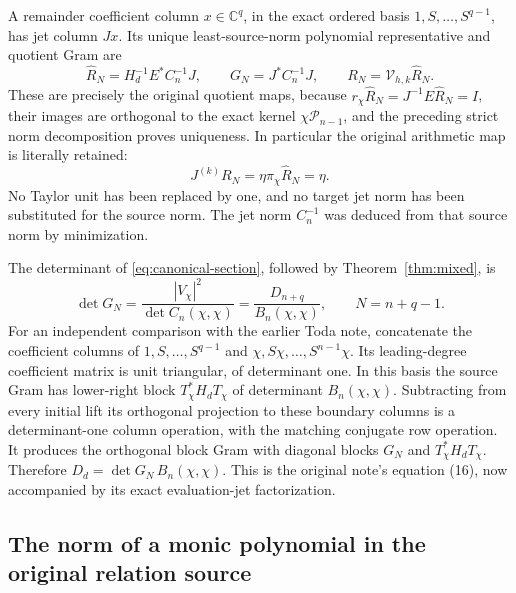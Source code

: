 \documentclass[11pt]{article}
\newcommand{\C}{\mathbb C}
\newcommand{\Pp}{\mathcal P}
\begin{document}
A remainder coefficient column \(x\in\C^q\), in the exact ordered basis
\(1,S,\ldots,S^{q-1}\), has jet column \(Jx\). Its unique
least-source-norm polynomial representative and quotient Gram are
\begin{equation}\label{eq:canonical-section}
 \widehat R_N=H_d^{-1}E^*C_n^{-1}J,\qquad
 G_N=J^*C_n^{-1}J,\qquad R_N=\mathcal V_{h,k}\widehat R_N.
\end{equation}
These are precisely the original quotient maps, because
\(r_\chi\widehat R_N=J^{-1}E\widehat R_N=I\), their images are
orthogonal to the exact kernel \(\chi\Pp_{n-1}\), and the preceding
strict norm decomposition proves uniqueness. In particular the
original arithmetic map is literally retained:
\[
 J^{(k)}R_N=\eta\pi_\chi\widehat R_N=\eta.
\]
No Taylor unit has been replaced by one, and no target jet norm has been
substituted for the source norm. The jet norm \(C_n^{-1}\) was deduced
from that source norm by minimization.

The determinant of \eqref{eq:canonical-section}, followed by
Theorem~\ref{thm:mixed}, is
\begin{equation}\label{eq:quotientdet}
 \boxed{\det G_N=\frac{|V_\chi|^2}{\det C_n(\chi,\chi)}
              =\frac{D_{n+q}}{B_n(\chi,\chi)},
       \qquad N=n+q-1.}
\end{equation}
For an independent comparison with the earlier Toda note, concatenate
the coefficient columns of
\(1,S,\ldots,S^{q-1}\) and
\(\chi,S\chi,\ldots,S^{n-1}\chi\).
Its leading-degree coefficient matrix is unit triangular, of determinant
one. In this basis the source Gram has lower-right block
\(T_\chi^*H_dT_\chi\) of determinant \(B_n(\chi,\chi)\).
Subtracting from every initial lift its orthogonal projection to these
boundary columns is a determinant-one column operation, with the
matching conjugate row operation. It produces the orthogonal block Gram
with diagonal blocks \(G_N\) and \(T_\chi^*H_dT_\chi\).
Therefore \(D_d=\det G_N\,B_n(\chi,\chi)\).
This is the original note's equation (16), now accompanied by its exact
evaluation-jet factorization.

\subsection{The norm of a monic polynomial in the original relation source}
\label{sec:relationnorm}
\end{document}

